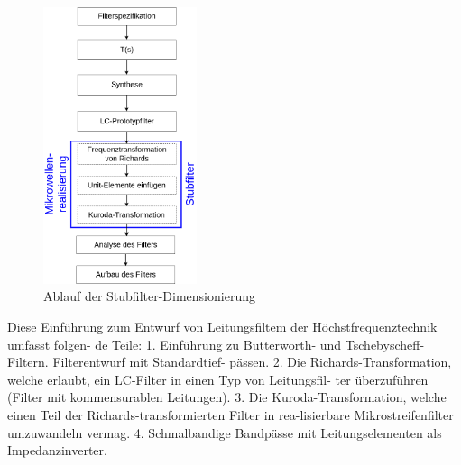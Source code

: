 \begin{figure}[h!]
\centering
 	\includegraphics[width=0.4\textwidth]{Ablauf_Filterdimensionierung.png}
 	\caption{Ablauf der Stubfilter-Dimensionierung}
 	\label{fig:Ablauf_Filterdimensionierung}
\end{figure}

















Diese Einführung zum Entwurf von Leitungsfiltem der Höchstfrequenztechnik umfasst folgen-
de Teile:
1. Einführung zu Butterworth- und Tschebyscheff-Filtern. Filterentwurf mit Standardtief-
pässen.
2. Die Richards-Transformation, welche erlaubt, ein LC-Filter in einen Typ von Leitungsfil-
ter überzuführen (Filter mit kommensurablen Leitungen).
3. Die Kuroda-Transformation, welche einen Teil der Richards-transformierten Filter in rea-lisierbare Mikrostreifenfilter umzuwandeln vermag.
4. Schmalbandige Bandpässe mit Leitungselementen als Impedanzinverter.








